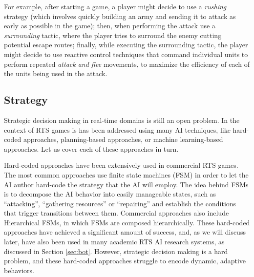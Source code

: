 \documentclass[journal]{IEEEtran}
\begin{document}
For example, after starting a game, a player might decide to use a {\em rushing} strategy (which involves quickly building an army and sending it to attack as early as possible in the game); then, when performing the attack use a {\em surrounding} tactic, where the player tries to surround the enemy cutting potential escape routes; finally, while executing the surrounding tactic, the player might decide to use reactive control techniques that command individual units to perform repeated {\em attack and flee} movements, to maximize the efficiency of each of the units being used in the attack.



\subsection{Strategy}

Strategic decision making in real-time domains is still an open problem. In the context of RTS games is has been addressed using many AI techniques, like hard-coded approaches, planning-based approaches, or machine learning-based approaches. Let us cover each of these approaches in turn.

Hard-coded approaches have been extensively used in commercial RTS games. The most common approaches use finite state machines (FSM) \cite{FSM_AIGameProgWisdom2003} in order to let the AI author hard-code the strategy that the AI will employ. The idea behind FSMs is to decompose the AI behavior into easily manageable states, such as ``attacking'', ``gathering resources'' or ``repairing'' and establish the conditions that trigger transitions between them. Commercial approaches also include Hierarchical FSMs, in which FSMs are composed hierarchically. These hard-coded approaches have achieved a significant amount of success, and, as we will discuss later, have also been used in many academic RTS AI research systems, as discussed in Section \ref{sec:bot}. However, strategic decision making is a hard problem, and these hard-coded approaches struggle to encode dynamic, adaptive behaviors. 
\end{document}
